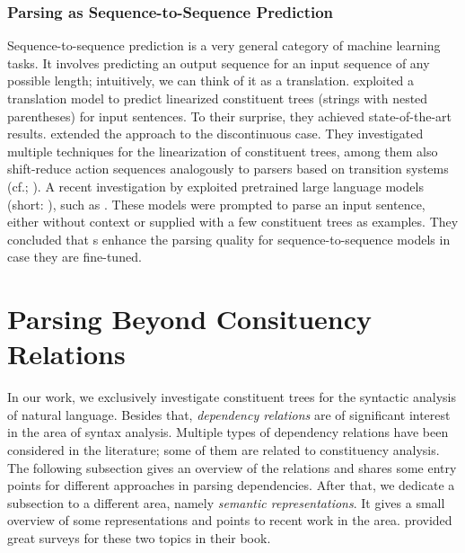 \documentclass[../document.tex]{subfiles}
\begin{document}
    \subsubsection*{Parsing as Sequence-to-Sequence Prediction}
    Sequence-to-sequence prediction is a very general category of machine learning tasks.
    It involves predicting an output sequence for an input sequence of any possible length; intuitively, we can think of it as a translation.
     exploited a translation model to predict linearized constituent trees (strings with nested parentheses) for input sentences.
    To their surprise, they achieved state-of-the-art results.
     extended the approach to the discontinuous case.
    They investigated multiple techniques for the linearization of constituent trees, among them also shift-reduce action sequences analogously to parsers based on transition systems (cf.\@ \citealp{Ma2017DeterministicAF}; \citealp{liu-zhang-2017-encoder}).
    A recent investigation by \citet{bai2023constituency} exploited pretrained large language models (short: ), such as  \citep{openai2023gpt4}.
    These models were prompted to parse an input sentence, either without context or supplied with a few constituent trees as examples.
    They concluded that s enhance the parsing quality for sequence-to-sequence models in case they are fine-tuned.

    \section{Parsing Beyond Consituency Relations}\label{sec:literature:beyond}
    In our work, we exclusively investigate constituent trees for the syntactic analysis of natural language.
    Besides that, \emph{dependency relations} are of significant interest in the area of syntax analysis.
    Multiple types of dependency relations have been considered in the literature; some of them are related to constituency analysis.
    The following subsection gives an overview of the relations and shares some entry points for different approaches in parsing dependencies.
    After that, we dedicate a subsection to a different area, namely \emph{semantic representations}.
    It gives a small overview of some representations and points to recent work in the area.
     provided great surveys for these two topics in their book.
\end{document}
